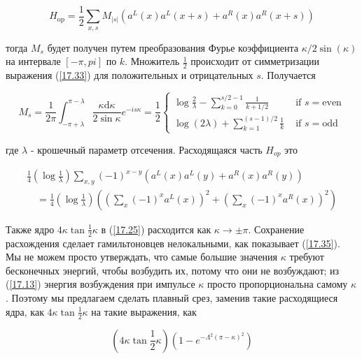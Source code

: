 \documentclass[main.tex]{subfiles}
\begin{document}
\begin{equation}\label{17.33}
	H_{\mathrm{op}}=\frac{1}{2} \sum_{x, s} M_{|s|}\left(a^{L}(x) a^{L}(x+s)+a^{R}(x) a^{R}(x+s)\right)
\end{equation}

тогда $M_s$ будет получен путем преобразования Фурье коэффициента $\kappa/2\sin(\kappa)$ на
интервале $[-\pi,pi]$ по $k$. Множитель $\frac 1 2$ происходит от симметризации выражения (\ref{17.33}) для положительных и отрицательных $s$. Получается

\begin{equation}\label{17.34}
	M_{s}=\frac{1}{2 \pi} \int_{-\pi+\lambda}^{\pi-\lambda} \frac{\kappa \mathrm{d} \kappa}{2 \sin \kappa} e^{-i s \kappa}=\frac{1}{2}\left\{\begin{array}{ll}{\log \frac{2}{\lambda}-\sum_{k=0}^{s / 2-1} \frac{1}{k+1 / 2}} & {\text { if } s=\mathrm{even}} \\ {\log (2 \lambda)+\sum_{k=1}^{(s-1) / 2} \frac{1}{k}} & {\text { if } s=\mathrm{odd}}\end{array}\right.
\end{equation}

где $\lambda$ - крошечный параметр отсечения. Расходящаяся часть $H_{op}$ это

\begin{equation}\label{17.35}
	\begin{array}{l}{\frac{1}{4}\left(\log \frac{1}{\lambda}\right) \sum_{x, y}(-1)^{x-y}\left(a^{L}(x) a^{L}(y)+a^{R}(x) a^{R}(y)\right)} \\ {\quad=\frac{1}{4}\left(\log \frac{1}{\lambda}\right)\left(\left(\sum_{x}(-1)^{x} a^{L}(x)\right)^{2}+\left(\sum_{x}(-1)^{x} a^{R}(x)\right)^{2}\right)}\end{array}
\end{equation}

Также ядро $4 \kappa \tan \frac{1}{2} \kappa$ в (\ref{17.25}) расходится как $\kappa \rightarrow \pm \pi$. Сохранение расхождения сделает гамильтоновцев нелокальными, как показывает (\ref{17.35}). Мы не можем просто утверждать, что самые большие значения $\kappa$ требуют бесконечных энергий, чтобы возбудить их, потому что они не возбуждают; из (\ref{17.13}) энергия возбуждения при импульсе $\kappa$ просто пропорциональна самому $\kappa$. Поэтому мы предлагаем сделать плавный срез, заменив такие расходящиеся ядра, как $4 \kappa \tan \frac{1}{2} \kappa$ на такие выражения, как

\begin{equation}\label{17.36}
\left(4 \kappa \tan \frac{1}{2} \kappa\right)\left(1-e^{-\Lambda^{2}(\pi-\kappa)^{2}}\right)
\end{equation}
\end{document}
